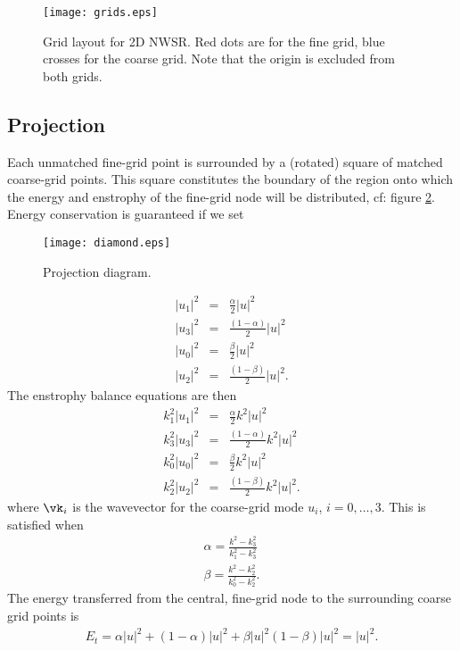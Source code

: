 \documentclass[10pt,showpacs,showkeys,%
amsfonts,amsmath,
onecolumn,
floatfix,aps,superscriptaddress]{revtex4}
\begin{document}
\begin{figure}[htb]
  \begin{center}
    \texttt{[image: grids.eps]}
    \caption{Grid layout for 2D NWSR. Red dots are for the fine grid, blue
crosses for the coarse grid. Note that the origin is excluded from both grids.}
    \label{grids}
  \end{center}
\end{figure}

\subsection{Projection}
Each unmatched fine-grid point is surrounded by a (rotated) square of matched
coarse-grid points. This square constitutes the boundary of the region onto
which the energy and enstrophy of the fine-grid node will be distributed, 
cf: figure \ref{diamond}. Energy conservation is guaranteed if we 
set 
\begin{figure}[htb]
  \begin{center}
    \texttt{[image: diamond.eps]}
    \caption{Projection diagram.}
    \label{diamond}
  \end{center}
\end{figure}
\begin{eqnarray}
  |u_1|^2 &=& \frac{\alpha}{2} |u|^2 
  \\
  |u_3|^2 &=& \frac{(1-\alpha)}{2} |u|^2 
  \\
  |u_0|^2 &=& \frac{\beta}{2} |u|^2 
  \\
  |u_2|^2 &=& \frac{(1-\beta)}{2} |u|^2.
\end{eqnarray}
The enstrophy balance equations are then
\begin{eqnarray}
  k_1^2 |u_1|^2 &=& \frac{\alpha}{2} k^2|u|^2 
  \\
  k_3^2|u_3|^2 &=& \frac{(1-\alpha)}{2} k^2|u|^2 
  \\
  k_0^2|u_0|^2 &=& \frac{\beta}{2} k^2|u|^2 
  \\
  k_2^2|u_2|^2 &=& \frac{(1-\beta)}{2} k^2|u|^2.
\end{eqnarray}
where $\vk_i$ is the wavevector for the coarse-grid mode $u_i$, $i=0,\dots,3$.
This is satisfied when
\begin{eqnarray}
  \alpha = \frac{k^2 -k_3^2}{ k_1^2 -k_3^2}
  \\
  \beta = \frac{k^2 -k_2^2}{ k_0^2 -k_2^2}.
\end{eqnarray}
The energy transferred from the central, fine-grid node to the surrounding
coarse grid points is
\begin{eqnarray}
  E_t=\alpha |u|^2 + (1-\alpha) |u|^2 + \beta |u|^2  (1-\beta) |u|^2 
  = |u|^2.
\end{eqnarray}
\end{document}
